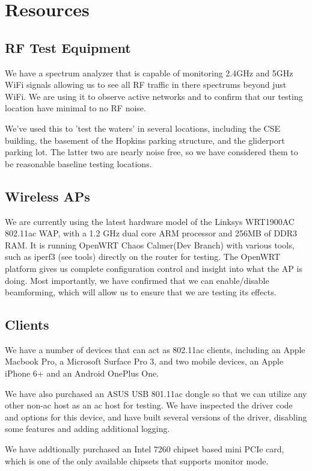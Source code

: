 \section{Resources}

\subsection{RF Test Equipment}

We have a spectrum analyzer that is capable of monitoring 2.4GHz and
5GHz WiFi signals allowing us to see all RF traffic in there spectrums
beyond just WiFi. We are using it to observe active networks and to
confirm that our testing location have minimal to no RF noise.

We've used this to 'test the waters' in several locations, including
the CSE building, the basement of the Hopkins parking structure, and
the gliderport parking lot. The latter two are nearly noise free, so
we have considered them to be reasonable baseline testing locations.

\subsection{Wireless APs}

We are currently using the latest hardware model of the Linksys
WRT1900AC 802.11ac WAP, with a 1.2 GHz dual core ARM processor and
256MB of DDR3 RAM. It is running OpenWRT Chaos Calmer(Dev Branch) with
various tools, such as iperf3 (see tools) directly on the router for
testing. The OpenWRT platform gives us complete configuration control
and insight into what the AP is doing. Most importantly, we have
confirmed that we can enable/disable beamforming, which will allow us
to ensure that we are testing its effects.

\subsection{Clients}

We have a number of devices that can act as
802.11ac clients, including an Apple Macbook Pro, a Microsoft Surface Pro 3,
and two mobile devices, an Apple iPhone 6+ and an Android OnePlus
One.

We have also purchased an ASUS USB 801.11ac dongle so that we can
utilize any other non-ac host as an ac host for testing. We have
inspected the driver code and options for this device, and have built
several versions of the driver, disabling some features and adding
additional logging.

We have addtionally purchased an Intel 7260 chipset based mini PCIe
card, which is one of the only available chipsets that supports
monitor mode.

